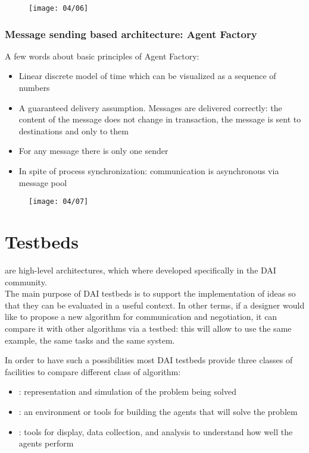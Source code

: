 \begin{figure}[!h]
\centering
\texttt{[image: 04/06]}
\end{figure}


\subsubsection{Message sending based architecture: Agent Factory}
A few words about basic principles of Agent Factory:
\begin{itemize}
\item Linear discrete model of time which can be visualized as a sequence of numbers
\item A guaranteed delivery assumption. Messages are delivered correctly: the content of the message does not change in transaction, the message is sent to destinations and only to them
\item For any message there is only one sender
\item In spite of process synchronization: communication is asynchronous via message pool
\end{itemize}

\begin{figure}[!h]
\centering
\texttt{[image: 04/07]}
\end{figure}

\section{Testbeds}
 are high-level architectures, which where developed specifically in the DAI community.\\
The main purpose of DAI testbeds is to support the implementation of ideas so that they can be evaluated in a useful context. In other terms, if a designer would like to propose a new algorithm for communication and negotiation, it can compare it with other algorithms via a testbed: this will allow to use the same example, the same tasks and the same system.

In order to have such a possibilities most DAI testbeds provide three classes of facilities to compare different class of algorithm:
\begin{itemize}
\item {}: representation and simulation of the problem being solved
\item {}: an environment or tools for building the agents that will solve the problem
\item {}: tools for display, data collection, and analysis to understand how well the agents perform
\end{itemize}

